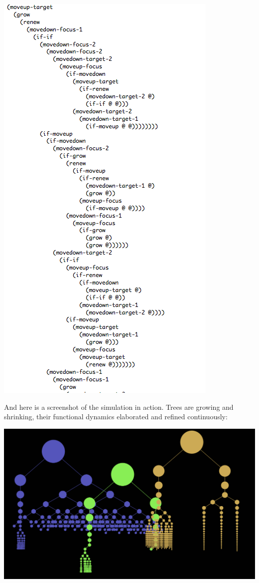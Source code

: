 \documentclass[12pt]{article}
\begin{document}
\begin{center}
\includegraphics[scale=0.45]{treecode.png}
\end{center}

And here is a screenshot of the simulation in action.  Trees are growing and shrinking, their functional dynamics elaborated and refined continuously:

\begin{center}
\includegraphics[scale=0.4]{treegrowth.png}
\end{center}
\end{document}
